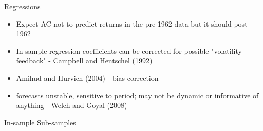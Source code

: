 \documentclass{beamer}
\begin{document}

\begin{frame}{Regressions}
	\begin{itemize}[<+->]
		\item Expect AC not to predict returns in the pre-1962 data but it should post-1962
		\item In-sample regression coefficients can be corrected for possible "volatility feedback" -  Campbell and
		Hentschel (1992)
		\item Amihud and Hurvich (2004) - bias correction
		\item forecasts unstable, sensitive to period; may not be dynamic or informative of anything - Welch and Goyal (2008)
	\end{itemize}
\end{frame}

\begin{frame}{In-sample Sub-samples}
	\begin{adjustbox}{width=\textwidth}
		
	\end{adjustbox}
	\begin{adjustbox}{width=\textwidth}
		
	\end{adjustbox}
\end{frame}
\end{document}
